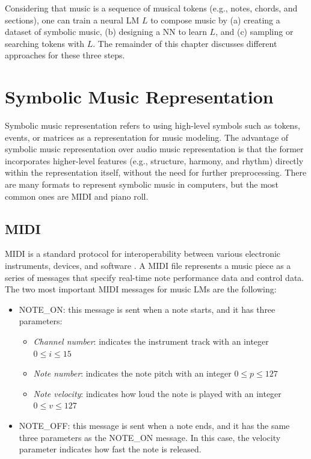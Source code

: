 Considering that music is a sequence of musical tokens (e.g., notes, chords, and sections), one can train a neural LM $L$ to compose music by (a) creating a dataset of symbolic music, (b) designing a NN to learn $L$, and (c) sampling or searching tokens with $L$. The remainder of this chapter discusses different approaches for these three steps.

\section{Symbolic Music Representation}

Symbolic music representation refers to using high-level symbols such as tokens, events, or matrices as a representation for music modeling. The advantage of symbolic music representation over audio music representation is that the former incorporates higher-level features (e.g., structure, harmony, and rhythm) directly within the representation itself, without the need for further preprocessing. There are many formats to represent symbolic music in computers, but the most common ones are MIDI and piano roll.

\subsection{MIDI}
MIDI is a standard protocol for interoperability between various electronic instruments, devices, and software \cite{briot2017deep}. A MIDI file represents a music piece as a series of messages that specify real-time note performance data and control data. The two most important MIDI messages for music LMs are the following:

\begin{itemize}
  \item NOTE\_ON: this message is sent when a note starts, and it has three parameters:
  \begin{itemize}
      \item \textit{Channel number}: indicates the instrument track with an integer $0 \leq i \leq 15$
      \item \textit{Note number}: indicates the note pitch with an integer $0 \leq p \leq 127$
      \item \textit{Note velocity}: indicates how loud the note is played with an integer
      $0 \leq v \leq 127$
  \end{itemize}

  \item NOTE\_OFF: this message is sent when a note ends, and it has the same three parameters as the
  NOTE\_ON message. In this case, the velocity parameter indicates how fast the note is released.
\end{itemize}

